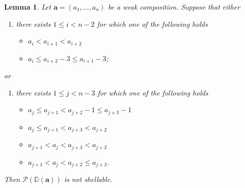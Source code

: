 \documentclass[letterpaper,10pt]{article}
\newtheorem{lemma}[theorem]{Lemma}
\begin{document}
\begin{lemma}\label{lem:key1}
Let $\mathbf{a}=(a_1,\hdots,a_n)$ be a weak composition. Suppose that either
\begin{enumerate}
    \item[\textup{(a)}] there exists $1\le i<n-2$ for which one of the following holds 
\begin{itemize}
    \item[\textup{(i)}] $a_i<a_{i+1}<a_{i+2}$
    \item[\textup{(ii)}] $a_i\le a_{i+2}-3\le a_{i+1}-3$;
\end{itemize}
\end{enumerate}
or
\begin{enumerate}
    \item[\textup{(b)}] there exists $1\le j<n-3$ for which one of the following holds
\begin{itemize}
    \item[\textup{(i)}] $a_j\le a_{j+1}<a_{j+2}-1\le a_{j+3}-1$
    \item[\textup{(ii)}] $a_j\le a_{j+1}<a_{j+3}< a_{j+2}$
    \item[\textup{(iii)}] $a_{j+1}< a_{j}<a_{j+3}< a_{j+2}$
    \item[\textup{(iv)}] $a_{j+1}< a_{j}<a_{j+2}\le a_{j+3}$.
\end{itemize}
\end{enumerate}
Then $\mathcal{P}(\mathbb{D}(\mathbf{a}))$ is not shellable.
\end{lemma}
\end{document}
